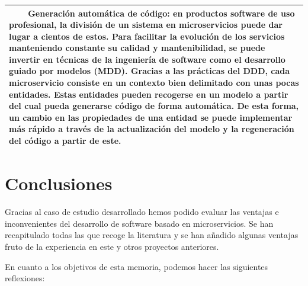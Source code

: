 \documentclass[11pt,spanish,listoffigures]{tfgetsinf}
\newcommand{\tabitem}{~~\llap{\textbullet}~~}
\begin{document}
\begin{center}
\begin{tabular}{|p{14.2cm}|}
\vspace{2mm}
\tabitem \textbf{Generación automática de código}: en productos software de uso profesional, la división de un sistema en microservicios puede dar lugar a cientos de estos. Para facilitar la evolución de los servicios manteniendo constante su calidad y mantenibilidad, se puede invertir en técnicas de la ingeniería de software como el desarrollo guiado por modelos (MDD). Gracias a las prácticas del DDD, cada microservicio consiste en un contexto bien delimitado con unas pocas entidades. Estas entidades pueden recogerse en un modelo a partir del cual pueda generarse código de forma automática. De esta forma, un cambio en las propiedades de una entidad se puede implementar más rápido a través de la actualización del modelo y la regeneración del código a partir de este.

\\
\hline

\end{tabular}
\end{center}


\chapter{Conclusiones} \label{ch:Conclusiones}

Gracias al caso de estudio desarrollado hemos podido evaluar las ventajas e inconvenientes del desarrollo de software basado en microservicios. Se han recapitulado todas las que recoge la literatura y se han añadido algunas ventajas fruto de la experiencia en este y otros proyectos anteriores. 

En cuanto a los objetivos de esta memoria, podemos hacer las siguientes reflexiones:
\end{document}
